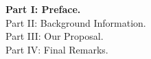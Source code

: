 \begin{description}
    \item[\textbf{Part I: Preface.}] 
    
    \item[Part II: Background Information.] 
    
    \item[Part III: Our Proposal.]
    
    \item[Part IV: Final Remarks.]
\end{description}